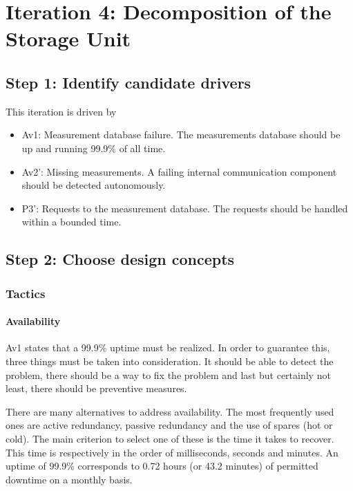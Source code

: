 \section{Iteration 4: Decomposition of the Storage Unit}
\label{add:it4}

\subsection{Step 1: Identify candidate drivers}
\label{add:it4/drivers}

\npar This iteration is driven by

\begin{itemize}
	\item Av1: Measurement database failure. The measurements database should be up
	and running 99.9\% of all time. 
	\item Av2': Missing measurements. A failing internal communication component
	should be detected autonomously. 
  	\item P3': Requests to the measurement database. The requests should be
  	handled within a bounded time. 
\end{itemize}

\subsection{Step 2: Choose design concepts}
\label{add:it4/concepts}

\subsubsection{Tactics}
\label{add:it4/tactics}

\paragraph{Availability} 

\npar Av1 states that a 99.9\% uptime must be realized. In order to guarantee
this, three things must be taken into consideration. It should be able to detect
the problem, there should be a way to fix the problem and last but certainly not
least, there should be preventive measures.

\npar There are many alternatives to address availability. The most frequently
used ones are active redundancy, passive redundancy and the use of spares (hot
or cold). The main criterion to select one of these is the time it takes to
recover. This time is respectively in the order of milliseconds, seconds and
minutes. An uptime of 99.9\% corresponds to 0.72 hours (or 43.2 minutes) of
permitted downtime on a monthly basis. 


